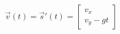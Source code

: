 \documentclass[preview]{standalone}
\begin{document}
\begin{align*}
\vec{v}(t) = \vec{s}'(t) = \begin{bmatrix} v_x \\ v_y - gt \end{bmatrix}
\end{align*}
\end{document}
